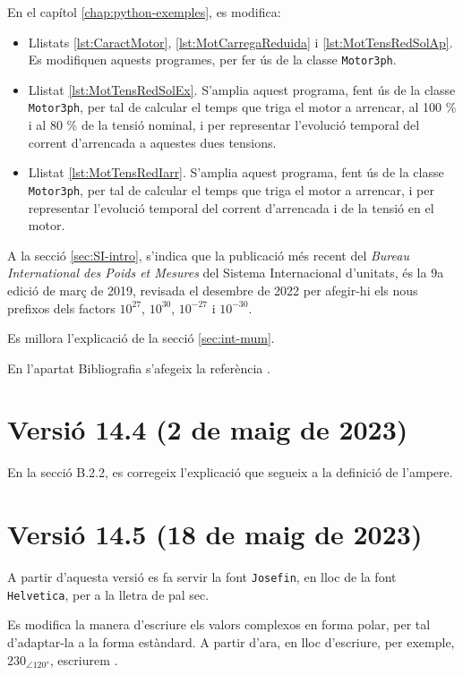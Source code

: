 En el capítol \ref{chap:python-exemples}, es modifica:
\begin{itemize}
	\item Llistats \ref{lst:CaractMotor}, \ref{lst:MotCarregaReduida} i \ref{lst:MotTensRedSolAp}. Es modifiquen aquests programes, per fer ús de la classe \texttt{Motor3ph}.
	\item Llistat \ref{lst:MotTensRedSolEx}. S'amplia aquest programa, fent ús de la classe \texttt{Motor3ph}, per tal de calcular el temps que triga el motor a arrencar, al 100 \% i al 80 \% de la tensió nominal, i per representar l'evolució temporal del corrent d'arrencada a aquestes dues tensions.	
	\item  Llistat \ref{lst:MotTensRedIarr}. S'amplia aquest programa, fent ús de la classe \texttt{Motor3ph}, per tal de calcular el temps que triga el motor a arrencar, i per representar l'evolució temporal del  corrent d'arrencada i de la tensió en el motor.
\end{itemize}

A la secció \ref{sec:SI-intro}, s'indica que la publicació més recent del \textit{Bureau 	International des Poids et Mesures} del Sistema Internacional d'unitats, és la  9a edició de març de 2019, revisada el desembre de 2022 per afegir-hi els nous prefixos dels factors $10^{27}$,  $10^{30}$,  $10^{-27}$ i  $10^{-30}$.

Es millora l'explicació de la secció \ref{sec:int-mum}.

En l'apartat Bibliografia s'afegeix la referència \cite{ALL}.

\section*{Versió 14.4 (2 de maig de 2023)}

En la secció B.2.2, es corregeix l'explicació que segueix a la definició de l'ampere.

\section*{Versió 14.5 (18 de maig de 2023)}

A partir d'aquesta versió es fa servir la font \texttt{Josefin}, en lloc de la font \texttt{Helvetica},  per a la lletra de pal sec.

Es modifica  la manera d'escriure els valors complexos en forma polar, per tal d'adaptar-la a la forma estàndard. A partir d'ara, en lloc d'escriure, per exemple, $230_{\angle\ang{120}}$, escriurem .

